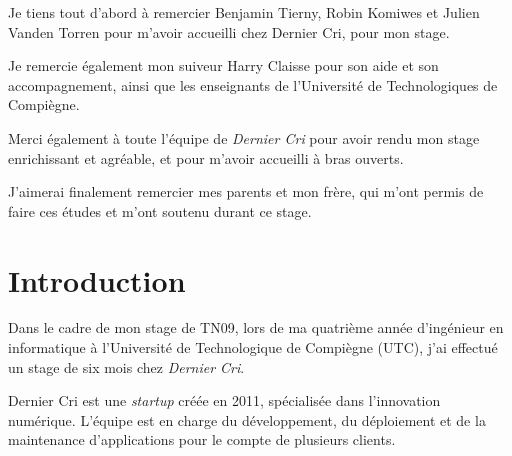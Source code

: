 \documentclass[12pt,a4paper]{article}
\begin{document}
  Je tiens tout d'abord à remercier Benjamin Tierny, Robin Komiwes et
  Julien Vanden Torren pour m'avoir accueilli chez Dernier Cri, pour mon
  stage.

  \bigskip

  Je remercie également mon suiveur Harry Claisse pour son aide et son
  accompagnement, ainsi que les enseignants de l'Université de
  Technologiques de Compiègne.

  \bigskip

  Merci également à toute l'équipe de \emph{Dernier Cri} pour avoir rendu
  mon stage enrichissant et agréable, et pour m'avoir accueilli à bras
  ouverts.

  \bigskip

  J'aimerai finalement remercier mes parents et mon frère, qui m'ont
  permis de faire ces études et m'ont soutenu durant ce stage.

  \newpage

  \section{Introduction}\label{introduction}

  \bigskip

  Dans le cadre de mon stage de TN09, lors de ma quatrième année
  d'ingénieur en informatique à l'Université de Technologique de Compiègne
  (UTC), j'ai effectué un stage de six mois chez \emph{Dernier Cri}.

  \bigskip

  Dernier Cri est une \emph{startup} créée en 2011, spécialisée dans
  l'innovation numérique. L'équipe est en charge du développement, du
  déploiement et de la maintenance d'applications pour le compte de
  plusieurs clients.
\end{document}
